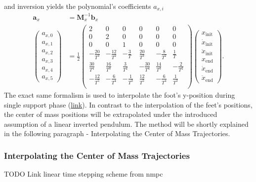 and inversion yields the polynomial's coefficients $a_{x,i}$
\begin{align}
	\bm{a}_x &= \bm{M}_x^{-1}\bm{b}_x \\
	\begin{pmatrix}
		a_{x,0} \\
		a_{x,1} \\
		a_{x,2} \\
		a_{x,3} \\
		a_{x,4} \\
		a_{x,5}
	\end{pmatrix} &= 
	\frac{1}{2}
	\begin{pmatrix}
		2 & 0 & 0 & 0 & 0 & 0 \\
		0 & 2 & 0 & 0 & 0 & 0 \\
		0 & 0 & 1 & 0 & 0 & 0 \\
		-\frac{20}{T^3} & -\frac{12}{T^2} & -\frac{3}{T} & \frac{20}{T^3} & -\frac{8}{T^2} & \frac{1}{T} \\
		\frac{30}{T^4} & \frac{16}{T^3} & \frac{3}{T^2} & -\frac{30}{T^4} & \frac{14}{T^3} & -\frac{2}{T^2} \\
		-\frac{12}{T^5} & -\frac{6}{T^4} & -\frac{1}{T^3} & \frac{12}{T^5} & -\frac{6}{T^4} & \frac{1}{T^3} \\
	\end{pmatrix}
	\begin{pmatrix}
		x_\text{init} \\
		\dot{x}_\text{init} \\
		\ddot{x}_\text{init} \\
		x_\text{end} \\
		\dot{x}_\text{end} \\
		\ddot{x}_\text{end} 
	\end{pmatrix}.
\end{align}
The exact same formalism is used to interpolate the foot's y-position during single support phase (\href{https://github.com/mhubii/nmpc_pattern_generator/blob/c82c64a28da7527e75442764f585bd50a8f61ee9/libs/pattern_generator/src/interpolation.cpp#L806}{link}). In contrast to the interpolation of the feet's positions, the center of mass positions will be extrapolated under the introduced assumption of a linear inverted pendulum. The method will be shortly explained in the following paragraph - Interpolating the Center of Mass Trajectories.
\subsubsection{Interpolating the Center of Mass Trajectories}
TODO Link linear time stepping scheme from nmpc